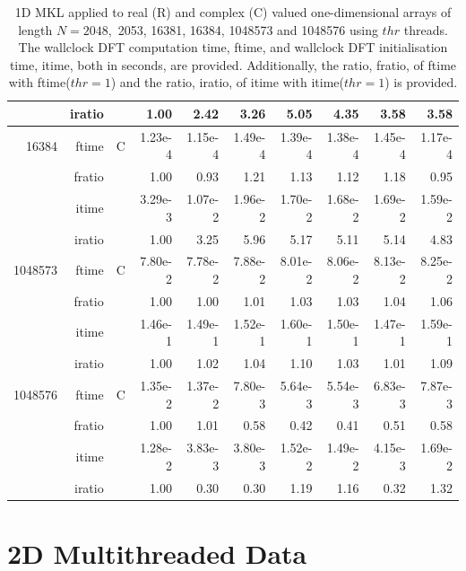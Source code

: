 \documentclass[a4paper]{article}
\begin{document}
\begin{table}[htbp]
\begin{center}
\begin{small}
\begin{tabular}{|r|r|r|r|r|r|r|r|r|r|}
     & iratio & &    1.00 &   2.42 &   3.26 &   5.05 &   4.35 &   3.58 &   3.58  \\ \hline
 16384  & ftime & C &  1.23e-4 &   1.15e-4 &   1.49e-4 &   1.39e-4 &   1.38e-4 &   1.45e-4 &   1.17e-4   \\ 
      & fratio & & 1.00 &   0.93 &   1.21 &   1.13 &   1.12 &   1.18 &   0.95  \\
     & itime & &  3.29e-3 &   1.07e-2 &   1.96e-2 &   1.70e-2 &   1.68e-2 &   1.69e-2 &   1.59e-2   \\ 
 & iratio & & 1.00 &   3.25 &   5.96 &   5.17 &   5.11 &   5.14 &   4.83   \\  \hline 
  1048573  & ftime & C &  7.80e-2 &   7.78e-2 &   7.88e-2 &   8.01e-2 &   8.06e-2 &   8.13e-2 &   8.25e-2      \\ 
      & fratio & &  1.00 &   1.00 &   1.01 &   1.03 &   1.03 &   1.04 &   1.06    \\ 
     & itime & &   1.46e-1 &   1.49e-1 &   1.52e-1 &   1.60e-1 &   1.50e-1 &   1.47e-1 &   1.59e-1   \\ 
     & iratio & &    1.00 &   1.02 &   1.04 &   1.10 &   1.03 &   1.01 &   1.09    \\ \hline 
 1048576  & ftime & C &  1.35e-2 &   1.37e-2 &   7.80e-3 &   5.64e-3 &   5.54e-3 &   6.83e-3 &   7.87e-3   \\ 
      & fratio & &  1.00 &   1.01 &   0.58 &   0.42 &   0.41 &   0.51 &   0.58  \\
     & itime & &  1.28e-2 &   3.83e-3 &   3.80e-3 &   1.52e-2 &   1.49e-2 &   4.15e-3 &   1.69e-2   \\ 
 & iratio & &  1.00 &   0.30 &   0.30 &   1.19 &   1.16 &   0.32 &   1.32 
  \\  \hline 
\end{tabular}
\caption{1D MKL applied to real (R) and complex (C) valued one-dimensional arrays of length $N=2048,$ 2053, 16381, 16384, 1048573 and 1048576  using $thr$ threads. The wallclock DFT computation time, ftime, and wallclock DFT initialisation time, itime, both in seconds, are provided. Additionally,  the ratio, fratio, of ftime  with ftime($thr=1$) and the ratio, iratio, of itime  with itime($thr=1$) is provided. }\label{Tbl:MKL1d}
\end{small}
\end{center}
\end{table}

\clearpage

\section{2D Multithreaded Data}\label{App:2Dthr}
\end{document}
